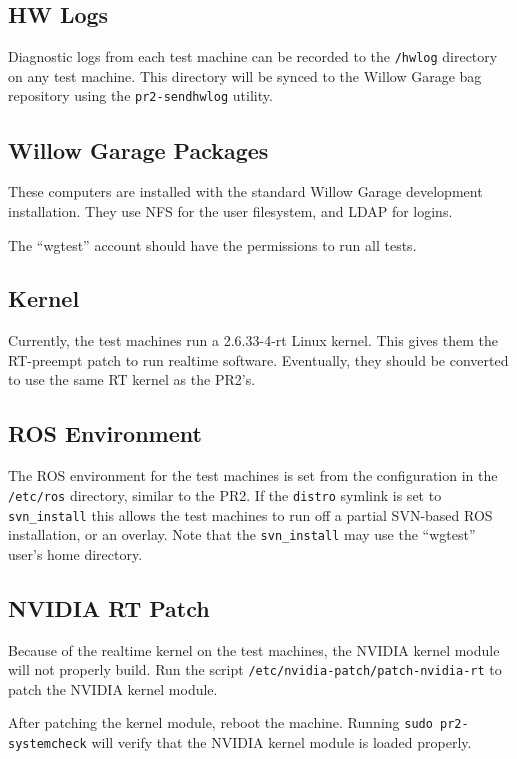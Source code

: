 \documentclass[11pt]{book}
\begin{document}
\subsection{HW Logs}

Diagnostic logs from each test machine can be recorded to the \texttt{/hwlog} directory on any test machine. This directory will be synced to the Willow Garage bag repository using the \texttt{pr2-sendhwlog} utility. 

\subsection{Willow Garage Packages}

These computers are installed with the standard Willow Garage development installation. They use NFS for the user filesystem, and LDAP for logins. 

The ``wgtest'' account should have the permissions to run all tests.

\subsection{Kernel}

Currently, the test machines run a 2.6.33-4-rt Linux kernel. This gives them the RT-preempt patch to run realtime software. Eventually, they should be converted to use the same RT kernel as the PR2's.

\subsection{ROS Environment}

The ROS environment for the test machines is set from the configuration in the \texttt{/etc/ros} directory, similar to the PR2. If the \texttt{distro} symlink is set to \texttt{svn\_install} this allows the test machines to run off a partial SVN-based ROS installation, or an overlay. Note that the \texttt{svn\_install} may use the ``wgtest'' user's home directory.

\subsection{NVIDIA RT Patch}

Because of the realtime kernel on the test machines, the NVIDIA kernel module will not properly build. Run the script \texttt{/etc/nvidia-patch/patch-nvidia-rt} to patch the NVIDIA kernel module.

After patching the kernel module, reboot the machine. Running \texttt{sudo pr2-systemcheck} will verify that the NVIDIA kernel module is loaded properly.
\end{document}
